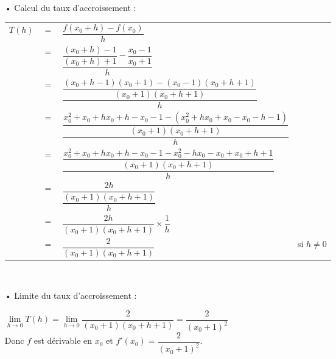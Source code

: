 \begin{itemize}
\item[•] Calcul du taux d'accroissement : \vspace*{.3cm}
\\
\begin{tabular}{llll}
$T(h)$ & $=$ & $\dfrac{f(x_0 + h) - f(x_0)}{h}$ & \vspace*{.3cm} \\
& $=$ & $\dfrac{\dfrac{(x_0 + h) - 1}{(x_0 + h) + 1} - \dfrac{x_0 - 1}{x_0 + 1}}{h}$ & \vspace*{.3cm} \\
& $=$ & $\dfrac{\dfrac{\left(x_0 + h - 1\right)\left(x_0 + 1\right)-\left(x_0 - 1\right)\left(x_0 + h + 1\right)}{\left(x_0 + 1\right)\left(x_0 + h + 1\right)}}{h}$ & \vspace*{.3cm} \\
& $=$ & $\dfrac{\dfrac{x_0^2 + x_0 + hx_0 + h - x_0 -1 - \left(x_0^2 + hx_0 + x_0 - x_0 - h - 1\right)}{\left(x_0 + 1\right)\left(x_0 + h +1\right)}}{h}$ & \vspace*{.3cm} \\
& $=$ & $\dfrac{\dfrac{x_0^2 + x_0 + hx_0 + h - x_0 -1 - x_0^2 - hx_0 - x_0 + x_0 + h +1}{\left(x_0 + 1\right)\left(x_0 + h + 1\right)}}{h}$ & \vspace*{.3cm} \\
& $=$ & $\dfrac{\dfrac{2h}{\left(x_0 + 1\right)\left(x_0 + h + 1\right)}}{h}$ & \vspace*{.3cm} \\
& $=$ & $\dfrac{2h}{\left(x_0 + 1\right)\left(x_0 + h + 1\right)} \times \dfrac{1}{h}$ & \vspace*{.3cm} \\
& $ = $& $ \dfrac{2}{\left(x_0 + 1\right)\left(x_0 + h + 1\right)}$ & si $h \neq 0$ \\
\end{tabular} \\
\vspace*{.3cm}

\item[•] Limite du taux d'accroissement : \vspace*{.3cm}

$\lim\limits_{h \to 0} T(h) = \lim\limits_{h \to 0} \dfrac{2}{\left(x_0 + 1\right)\left(x_0 + h + 1\right)} = \dfrac{2}{\left(x_0 + 1\right)^2}$ \vspace*{.3cm} \\

Donc $f$ est dérivable en $x_0$ et $f'(x_0) = \dfrac{2}{\left(x_0 + 1\right)^2}$. \\


\end{itemize}

